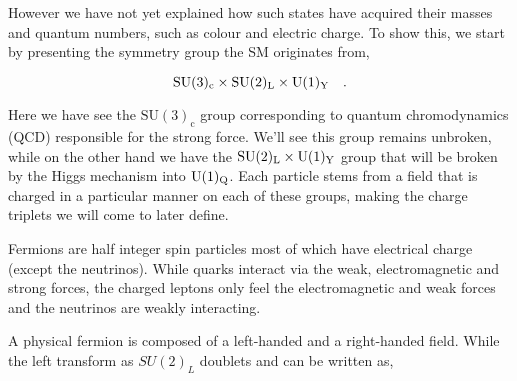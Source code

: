However we have not yet explained how such states have acquired their masses and quantum numbers, such as colour and electric charge. To show this, we start by presenting the symmetry group the SM originates from,

\begin{equation}
\mathrm{SU}(3)_{\mathrm{c}} \times \mathrm{SU}(2)_{\mathrm{L}} \times \mathrm{U}(1)_{\mathrm{Y}} \quad  .
\label{eq:SM Group}
\end{equation} 

Here we have see the $\mathrm{SU}(3)_{\mathrm{c}}$ group corresponding to quantum chromodynamics (QCD) responsible for the strong force. We'll see this group remains unbroken, while on the other hand we have the $\mathrm{SU}(2)_{\mathrm{L}} \times \mathrm{U}(1)_{\mathrm{Y}}$ group that will be broken by the Higgs mechanism into $\mathrm{U}(1)_{\mathrm{Q}}$. Each particle stems from a field that is charged in a particular manner on each of these groups, making the charge triplets we will come to later define.   

Fermions are half integer spin particles most of which have electrical charge (except the neutrinos).  While quarks interact via the weak, electromagnetic and strong forces, the charged leptons only feel the electromagnetic and weak forces and the neutrinos are weakly interacting.  

A physical fermion is composed of a left-handed and a right-handed field. While the left transform as $SU(2)_L$ doublets and can be written as,

